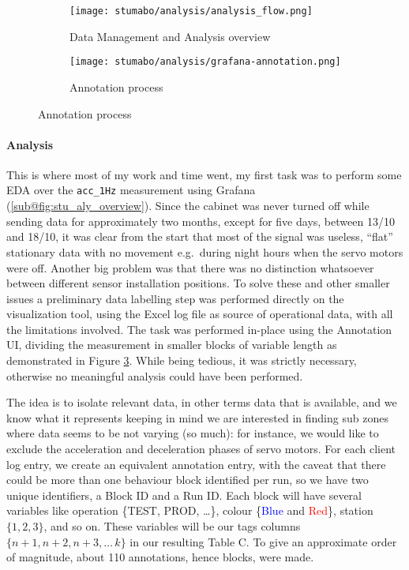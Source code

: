 \begin{figure}[ht]
    \begin{subfigure}{.495\textwidth}
        \texttt{[image: stumabo/analysis/analysis\_flow.png]}
        \caption{Data Management and Analysis overview}
        \label{fig:stu_aly_overview}
    \end{subfigure}
    \begin{subfigure}{.495\textwidth}
        \texttt{[image: stumabo/analysis/grafana-annotation.png]} 
        \caption{Annotation process}
        \label{fig:stu_annotation}
    \end{subfigure}
\end{figure}

\paragraph{Analysis}
This is where most of my work and time went, my first task was to perform some \acl{EDA} over the \texttt{acc\_1Hz} measurement using Grafana (\ref{sub@fig:stu_aly_overview}).
Since the cabinet was never turned off while sending data for approximately two months, except for five days, between 13/10 and 18/10, it was clear from the start that most of 
the signal was useless, ``flat'' stationary data with no movement e.g.\ during night hours when the servo motors were off. 
Another big problem was that there was no distinction whatsoever between different sensor installation positions.
To solve these and other smaller issues a preliminary data labelling step was performed directly on the visualization tool, using the Excel log file as source of 
operational data, with all the limitations involved. The task was performed in-place using the Annotation UI, dividing the measurement in smaller blocks of variable length 
as demonstrated in Figure \ref{fig:stu_annotation}. While being tedious, it was strictly necessary, otherwise no meaningful analysis could have been performed.


The idea is to isolate relevant data, in other terms data that is available, and we know what it represents keeping in mind we are interested in finding sub zones 
where data seems to be not varying (so much): for instance, we would like to exclude the acceleration and deceleration phases of servo motors.
For each client log entry, we create an equivalent annotation entry, with the caveat that there could be more than one behaviour block identified per run, so we have two unique identifiers, a Block ID and a Run ID. 
Each block will have several variables like operation \{TEST, PROD, \dots\}, colour \{\textcolor{blue}{Blue} and \textcolor{red}{Red}\}, station $\{1,2,3\}$, and so on. 
These variables will be our tags columns $\{n+1, n+2, n+3, \dots\, k\}$ in our resulting Table C. To give an approximate order of magnitude, about 110 annotations, hence blocks, were made.

